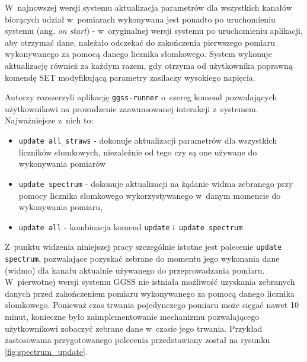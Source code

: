 

W~najnowszej wersji systemu aktualizacja parametrów dla wszystkich kanałów biorących udział w~pomiarach wykonywana jest ponadto po uruchomieniu systemu (ang. \emph{on start}) - w~oryginalnej wersji systemu po uruchomieniu aplikacji, aby otrzymać dane, należało odczekać do zakończenia pierwszego pomiaru wykonywanego za pomocą danego licznika słomkowego. System wykonuje aktualizację również za każdym razem, gdy otrzyma od użytkownika poprawną komendę SET modyfikującą parametry zasilaczy wysokiego napięcia.

Autorzy rozszerzyli aplikację \lstinline{ggss-runner} o~szereg komend pozwalających użytkownikowi na prowadzenie zaawansowanej interakcji z~systemem. Najważniejsze z~nich to:
\begin{itemize}
\item \lstinline{update all_straws} - dokonuje aktualizacji parametrów dla wszystkich liczników słomkowych, niezależnie od tego czy są one używane do wykonywania pomiarów
\item \lstinline{update spectrum} - dokonuje aktualizacji na żądanie widma zebranego przy pomocy licznika słomkowego wykorzystywanego w~danym momencie do wykonywania pomiaru, 
\item \lstinline{update all} - kombinacja komend \lstinline{update} i~\lstinline{update spectrum}
\end{itemize}

Z~punktu widzenia niniejszej pracy szczególnie istotne jest polecenie \lstinline{update spectrum}, pozwalające pozyskać zebrane do momentu jego wykonania dane (widmo) dla kanału aktualnie używanego do przeprowadzania pomiaru. W~pierwotnej wersji systemu GGSS nie istniała możliwość uzyskania zebranych danych przed zakończeniem pomiaru wykonywanego za pomocą danego licznika słomkowego. Ponieważ czas trwania pojedynczego pomiaru może sięgać nawet 10 minut, konieczne było zaimplementowanie mechanizmu pozwalającego użytkownikowi zobaczyć zebrane dane w~czasie jego trwania. Przykład zastosowania przygotowanego polecenia przedstawiony został na rysunku \ref{fig:spectrum_update}.

